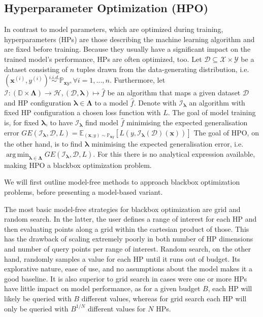 \documentclass[twoside,11pt]{article}
\DeclareMathOperator*{\argmin}{arg\,min}
\begin{document}
\subsection{Hyperparameter Optimization (HPO)}
In contrast to model parameters, which are optimized during training, hyperparameters (HPs) are those describing the machine learning algorithm and are fixed before training.
Because they usually have a significant impact on the trained model's performance, HPs are often optimized, too.
Let $\mathcal{D}\subseteq\mathcal{X}\times\mathcal{Y}$ be a dataset consisting of $n$
tuples drawn from the data-generating distribution, i.e. $(\boldsymbol{x}^{(i)}, y^{(i)})\stackrel{i.i.d.}{\sim}\mathbb{P}_{\boldsymbol{x}y},\forall i=1,...,n$.
Furthermore, let $\mathcal{I}:(\mathbb{D}\times\boldsymbol\Lambda)\rightarrow\mathcal{H}, (\mathcal{D},\boldsymbol\lambda)\mapsto\hat{f}$
be an algorithm that maps a given dataset $\mathcal{D}$ and HP configuration $\boldsymbol\lambda\in\boldsymbol\Lambda$ to a model $\hat{f}$.
Denote with $\mathcal{I}_{\boldsymbol\lambda}$ an algorithm with fixed HP configuration a chosen loss function with $L$.
The goal of model training is, for fixed $\boldsymbol\lambda$, to have $\mathcal{I}_{\boldsymbol\lambda}$ find model $\hat{f}$ minimising the expected generalisation error
$GE(\mathcal{I}_{\boldsymbol\lambda},\mathcal{D},L)=\mathbb{E}_{(\boldsymbol{x},y)\sim\mathbb{P}_{\boldsymbol{x}y}}[L(y,\mathcal{I}_{\boldsymbol\lambda}(\mathcal{D})(\boldsymbol{x}))]$
The goal of HPO, on the other hand, is to find $\boldsymbol\lambda$ minimising the expected generalisation error,
i.e. $\argmin_{\boldsymbol\lambda\in\boldsymbol\Lambda} GE(\mathcal{I}_{\boldsymbol\lambda},\mathcal{D},L)$.
For this there is no analytical expression available, making HPO a blackbox optimization problem. \citep[pp. 2f]{10.1145/3610536}

We will first outline model-free methods to approach blackbox optimization problems, before presenting a model-based variant.

The most basic model-free strategies for blackbox optimization are grid and random search.
In the latter, the user defines a range of interest for each HP and then evaluating points along a grid within the cartesian product of those.
This has the drawback of scaling extremely poorly in both number of HP dimensions and number of query points per range of interest.
Random search, on the other hand, randomly samples a value for each HP until it runs out of budget. Its explorative nature, ease of use, and no assumptions
about the model makes it a good baseline. It is also superior to grid search in cases were one or more HPs have little impact on model performance,
as for a given budget $B$, each HP will likely be queried with $B$ different values, whereas for grid search each HP will only be queried with $B^{1/N}$
different values for $N$ HPs. \citep[chap. 1.3]{feurer_hyperparameter_2019}
\end{document}
